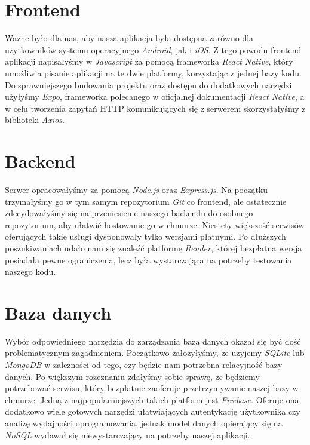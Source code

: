 \documentclass[inz, shortabstract]{iithesis}
\begin{document}
\section{Frontend}
Ważne było dla nas, aby nasza aplikacja była dostępna zarówno dla użytkowników systemu operacyjnego \textit{Android}, jak i \textit{iOS}. Z tego powodu frontend aplikacji napisałyśmy w \textit{Javascript} za pomocą frameworka \textit{React Native}\cite{reactnative}, który umożliwia pisanie aplikacji na te dwie platformy, korzystając z jednej bazy kodu. Do sprawniejszego budowania projektu oraz dostępu do dodatkowych narzędzi użyłyśmy \textit{Expo}\cite{expo}, frameworka polecanego w oficjalnej dokumentacji \textit{React Native}, a w celu tworzenia zapytań HTTP komunikujących się z serwerem skorzystałyśmy z biblioteki \textit{Axios}\cite{axios}.

\section{Backend}
Serwer opracowałyśmy za pomocą \textit{Node.js}\cite{nodejs} oraz \textit{Express.js}\cite{expressjs}. Na początku trzymałyśmy go w tym samym repozytorium \textit{Git} co frontend, ale ostatecznie zdecydowałyśmy się na przeniesienie naszego backendu do osobnego repozytorium, aby ułatwić hostowanie go w chmurze. Niestety większość serwisów oferujących takie usługi dysponowały tylko wersjami płatnymi. Po dłuższych poszukiwaniach udało nam się znaleźć platformę \textit{Render}\cite{render}, której bezpłatna wersja posiadała pewne ograniczenia, lecz była wystarczająca na potrzeby testowania naszego kodu. 

\section{Baza danych}
Wybór odpowiedniego narzędzia do zarządzania bazą danych okazał się być dość problematycznym zagadnieniem. Początkowo założyłyśmy, że użyjemy \textit{SQLite}\cite{sqlite} lub \textit{MongoDB}\cite{mongodb} w zależności od tego, czy będzie nam potrzebna relacyjność bazy danych. Po większym rozeznaniu zdałyśmy sobie sprawę, że będziemy potrzebować serwisu, który bezpłatnie zaoferuje przetrzymywanie naszej bazy w chmurze. Jedną z najpopularniejszych takich platform jest \textit{Firebase}\cite{firebase}. Oferuje ona dodatkowo wiele gotowych narzędzi ułatwiających autentykację użytkownika czy analizę wydajności oprogramowania, jednak model danych opierający się na \textit{NoSQL} wydawał się niewystarczający na potrzeby naszej aplikacji. 
\end{document}
